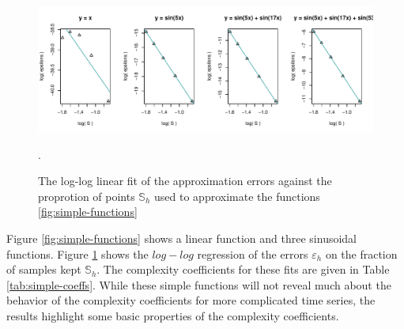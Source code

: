   \begin{figure}[h]
    \begin{center}
    \includegraphics[width = \textwidth, keepaspectratio]
    {./figs/coeff-interp-simple-fits.pdf}
    \end{center}
    \caption{The log-log linear fit of the approximation errors 
    against the proprotion of points $\mathbb{S}_h$ used to 
    approximate the functions \ref{fig:simple-functions}}.
    \label{fig:simple-fits}
  \end{figure}



Figure \ref{fig:simple-functions} shows a linear function and 
three sinusoidal functions. Figure \ref{fig:simple-fits} 
shows the $log-log$ regression of the errors $\varepsilon_h$ 
on the fraction of samples kept $\mathbb{S}_h$. The complexity coefficients for these fits are given in Table \ref{tab:simple-coeffs}. While these simple functions will not reveal much about the behavior of the complexity coefficients for more complicated time series, the results highlight some basic properties of the complexity coefficients.  

